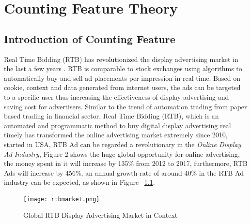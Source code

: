 \chapter{Counting Feature Theory}
\label{chapterlabel4}

\section{Introduction of Counting Feature}

Real Time Bidding (RTB) has revolutionized the display advertising market in the last a few years \cite{yuan2013real}. RTB is comparable to stock exchanges using algorithms to automatically buy and sell ad placements per impression in real time. Based on cookie, context and data generated from internet users, the ads can be targeted to a specific user thus increasing the effectiveness of display advertising and saving cost for advertisers. Similar to the trend of automation trading from paper based trading in financial sector, Real Time Bidding (RTB), which is an automated and programmatic method to buy
digital display advertising real timely has transformed the online advertising market extremely since 2010, started in USA, RTB Ad can be regarded a revolutionary in the \textit{Online Display Ad Industry}, Figure 2 shows the huge global opportunity for online advertising, the money spent in it will increase by 135\% from 2012 to 2017, furthermore, RTB Ads will increase by 456\%, an annual growth rate of around 40\% in the RTB Ad industry can be expected\cite{rtb2015}, as shown in Figure ~\ref{fig:rtbmarket}.
\begin{figure}[h]
\centering
\texttt{[image: rtbmarket.png]}
\caption{Global RTB Display Advertising Market in Context}
\label{fig:rtbmarket}
\end{figure}

